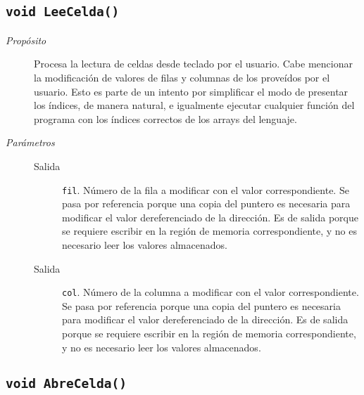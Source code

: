 \documentclass[12pt]{article}
\begin{document}
\subsection*{\texttt{void LeeCelda()}}

\begin{description}

\item[\emph{Propósito}]

Procesa la lectura de celdas desde teclado por el usuario. Cabe mencionar la
modificación de valores de filas y columnas de los proveídos por el usuario.
Esto es parte de un intento por simplificar el modo de presentar los índices, de
manera natural, e igualmente ejecutar cualquier función del programa con los
índices correctos de los arrays del lenguaje.

\item[\emph{Parámetros}] \leavevmode

\begin{description}

\item[Salida] \texttt{fil}. Número de la fila a modificar con el valor
correspondiente. Se pasa por referencia porque una copia del puntero es
necesaria para modificar el valor dereferenciado de la dirección. Es de salida
porque se requiere escribir en la región de memoria correspondiente, y no es
necesario leer los valores almacenados.

\item[Salida] \texttt{col}. Número de la columna a modificar con el
valor correspondiente. Se pasa por referencia porque una copia del puntero es
necesaria para modificar el valor dereferenciado de la dirección. Es de salida
porque se requiere escribir en la región de memoria correspondiente, y no es
necesario leer los valores almacenados.

\end{description}

\end{description}

\subsection*{\texttt{void AbreCelda()}}
\end{document}
